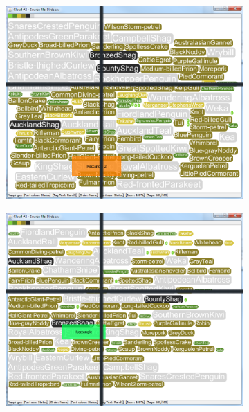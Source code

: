 \begin{figure}[!htb]
\begin{subfigure}{.5\textwidth}
  \includegraphics[scale=0.25]{Experiment2/T2/M3Spiral.png}
\end{subfigure}%
\begin{subfigure}{.5\textwidth}
  \centering
 \includegraphics[scale=0.25]{Experiment2/T2/M3Typewriter.png}
\end{subfigure}
\begin{subfigure}{.5\textwidth}
  \centering

\end{subfigure}
\end{figure}
